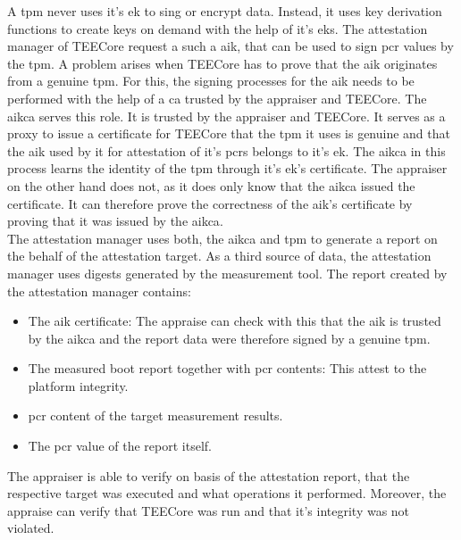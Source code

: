 A \gls{tpm} never uses it's \gls{ek} to sing or encrypt data. Instead, it uses
key derivation functions to create keys on demand with the help of it's
\glspl{ek}. The attestation manager of TEECore request a such a \gls{aik}, that
can be used to sign \gls{pcr} values by the \gls{tpm}. A problem arises when
TEECore has to prove that the \gls{aik} originates from a genuine \gls{tpm}. For
this, the signing processes for the \gls{aik} needs to be performed with the
help of a \gls{ca} trusted by the appraiser and TEECore. The \gls{aikca} serves
this role. It is trusted by the appraiser and TEECore. It serves as a proxy to
issue a certificate for TEECore that the \gls{tpm} it uses is genuine and that
the \gls{aik} used by it for attestation of it's \glspl{pcr} belongs to it's
\gls{ek}. The \gls{aikca} in this process learns the identity of the \gls{tpm}
through it's \gls{ek}'s certificate. The appraiser on the other hand does not,
as it does only know that the \gls{aikca} issued the certificate. It can
therefore prove the correctness of the \gls{aik}'s certificate by proving that
it was issued by the \gls{aikca}.\\

The attestation manager uses both, the \gls{aikca} and \gls{tpm} to generate a
report on the behalf of the attestation target. As a third source of data, the
attestation manager uses digests generated by the measurement tool. The report
created by the attestation manager contains:
\begin{itemize}
    \item The \gls{aik} certificate: The appraise can check with this that the
          \gls{aik} is trusted by the \gls{aikca} and the report data were
          therefore signed by a genuine \gls{tpm}.
    \item The measured boot report together with \gls{pcr} contents: This attest
          to the platform integrity.
    \item \gls{pcr} content of the target measurement results.
    \item The \gls{pcr} value of the report itself.
\end{itemize}

The appraiser is able to verify on basis of the attestation report, that the
respective target was executed and what operations it performed. Moreover, the
appraise can verify that TEECore was run and that it's integrity was not
violated.

